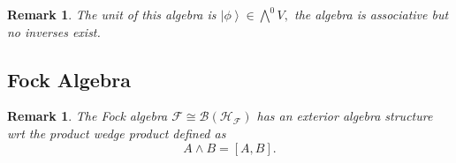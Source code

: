 \documentclass[aps,preprint]{revtex4}%
\newtheorem{remark}[theorem]{Remark}
\begin{document}
\begin{remark}
The unit of this algebra is $\left\vert \phi\right\rangle \in%
{\textstyle\bigwedge\nolimits^{0}}
V,$ the algebra is associative but no inverses exist.
\end{remark}

\subsection{Fock Algebra}

\begin{remark}
The Fock algebra $\mathcal{F\cong B}\left(  \mathcal{H}_{\mathcal{F}}\right)
$ has an exterior algebra structure wrt the product wedge product defined as
\begin{equation}
A\wedge B=\left[  A,B\right]  .
\end{equation}

\end{remark}
\end{document}

